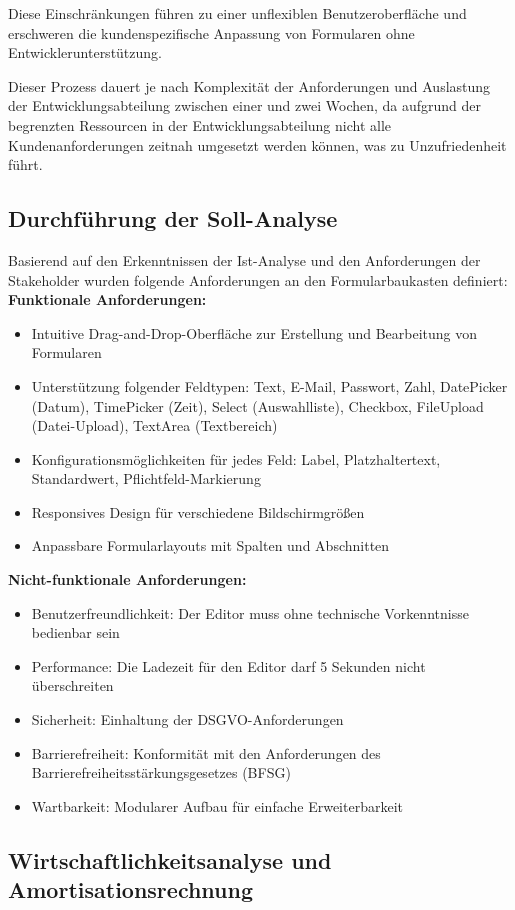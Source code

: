 \documentclass[a4paper,11pt]{article}
\begin{document}
\noindent Diese Einschränkungen führen zu einer unflexiblen Benutzeroberfläche und erschweren die kundenspezifische Anpassung von Formularen ohne Entwicklerunterstützung.

\noindent Dieser Prozess dauert je nach Komplexität der Anforderungen und Auslastung der Entwicklungsabteilung zwischen einer und zwei Wochen, da aufgrund der begrenzten Ressourcen in der Entwicklungsabteilung nicht alle Kundenanforderungen zeitnah umgesetzt werden können, was zu Unzufriedenheit führt.

\subsection{Durchführung der Soll-Analyse}
Basierend auf den Erkenntnissen der Ist-Analyse und den Anforderungen der Stakeholder wurden folgende Anforderungen an den Formularbaukasten definiert:
\textbf{Funktionale Anforderungen:}
\begin{itemize}
  \item Intuitive Drag-and-Drop-Oberfläche zur Erstellung und Bearbeitung von Formularen
  \item Unterstützung folgender Feldtypen: Text, E-Mail, Passwort, Zahl, DatePicker (Datum), TimePicker (Zeit), Select (Auswahlliste), Checkbox, FileUpload (Datei-Upload), TextArea (Textbereich)
  \item Konfigurationsmöglichkeiten für jedes Feld: Label, Platzhaltertext, Standardwert, Pflichtfeld-Markierung
  \item Responsives Design für verschiedene Bildschirmgrößen
  \item Anpassbare Formularlayouts mit Spalten und Abschnitten
\end{itemize}
\textbf{Nicht-funktionale Anforderungen:}
\begin{itemize}
  \item Benutzerfreundlichkeit: Der Editor muss ohne technische Vorkenntnisse bedienbar sein
  \item Performance: Die Ladezeit für den Editor darf 5 Sekunden nicht überschreiten
  \item Sicherheit: Einhaltung der DSGVO-Anforderungen
  \item Barrierefreiheit: Konformität mit den Anforderungen des Barrierefreiheitsstärkungsgesetzes (BFSG)
  \item Wartbarkeit: Modularer Aufbau für einfache Erweiterbarkeit
\end{itemize}

\subsection{Wirtschaftlichkeitsanalyse und Amortisationsrechnung}
\end{document}

